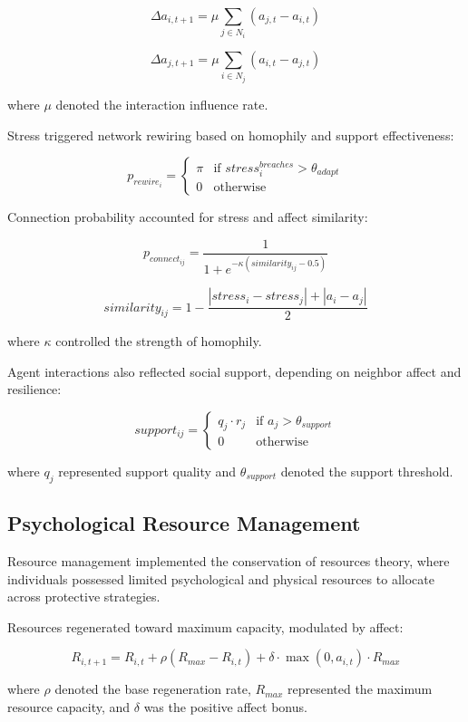 \documentclass[
  letterpaper,
  DIV=11,
  numbers=noendperiod]{scrartcl}
\begin{document}
\[\Delta a_{i,t+1} = \mu \sum_{j \in N_i} (a_{j,t} - a_{i,t})\]

\[\Delta a_{j,t+1} = \mu \sum_{i \in N_j} (a_{i,t} - a_{j,t})\]

where \(\mu\) denoted the interaction influence rate.

Stress triggered network rewiring based on homophily and support
effectiveness:

\[p_{rewire_i} = \begin{cases}
\pi & \text{if } stress_i^{breaches} > \theta_{adapt} \\ 0 & \text{otherwise} \end{cases}\]

Connection probability accounted for stress and affect similarity:

\[p_{connect_{ij}} = \frac{1}{1 + e^{-\kappa (similarity_{ij} - 0.5)}}\]

\[similarity_{ij} = 1 - \frac{|stress_i - stress_j| + |a_i - a_j|}{2}\]

where \(\kappa\) controlled the strength of homophily.

Agent interactions also reflected social support, depending on neighbor
affect and resilience:

\[support_{ij} = \begin{cases}
q_j \cdot r_j & \text{if } a_j > \theta_{support} \\ 0 & \text{otherwise} \end{cases}\]

where \(q_j\) represented support quality and \(\theta_{support}\)
denoted the support threshold.

\subsection{Psychological Resource
Management}\label{psychological-resource-management}

Resource management implemented the conservation of resources theory,
where individuals possessed limited psychological and physical resources
to allocate across protective strategies.

Resources regenerated toward maximum capacity, modulated by affect:

\[R_{i,t+1} = R_{i,t} + \rho (R_{max} - R_{i,t}) + \delta \cdot \max(0, a_{i,t}) \cdot R_{max}\]

where \(\rho\) denoted the base regeneration rate, \(R_{max}\)
represented the maximum resource capacity, and \(\delta\) was the
positive affect bonus.
\end{document}
